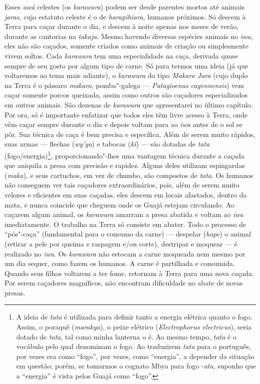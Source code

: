 Esses \emph{awá} celestes (os \emph{karawara}) podem ser desde parentes
mortos até animais \emph{jaras,} cujo estatuto celeste é o de
\emph{harapihiara}, humanos próximos. Só descem à Terra para caçar
durante o dia, e descem à noite apenas nos meses de verão, durante as
cantorias na \emph{takaja}. Mesmo havendo diversas espécies animais no
\emph{iwa}, eles não são caçados, somente criados como animais de
criação ou simplesmente vivem soltos. Cada \emph{karawara} tem uma
especialidade na caça, derivada quase sempre de seu gosto por algum tipo
de carne. Só para termos uma ideia (já que voltaremos ao tema mais
adiante), o \emph{karawara} do tipo \emph{Makaro Jara} (cujo duplo na
Terra é o pássaro \emph{makaro}, pomba"-galega --- \emph{Patagioenas}
\emph{cayennensis}) vem caçar somente porcos queixada, assim como outros
são caçadores especializados em outros animais. São dezenas de
\emph{karawara} que apresentarei no último capítulo. Por ora, só é
importante enfatizar que todos eles têm livre acesso à Terra, onde vêm
caçar sempre durante o dia e depois voltam para ao \emph{iwa} antes de o
sol se pôr. Sua técnica de caça é bem precisa e específica. Além de
serem muito rápidos, suas armas --- flechas (\emph{wy'ya}) e tabocas
(\emph{kĩ}) --- são dotadas de \emph{tata} (fogo/energia)\footnote{A ideia
  de \emph{tata} é utilizada para definir tanto a energia elétrica
  quanto o fogo. Assim, o poraquê (\emph{marakya}), o peixe elétrico
  (\emph{Electrophorus electricus}), seria dotado de \emph{tata}, tal
  como minha lanterna o é. Ao mesmo tempo, \emph{tata} é o vocábulo pelo
  qual denominam o fogo. Ao traduzirem \emph{tata} para o português, por
  vezes era como ``fogo'', por vezes, como ``energia'', a depender da
  situação em questão; porém, se tomarmos o cognato Mbya para fogo
  -\emph{ata}, suponho que a ``energia'' é vista pelos Guajá como ``fogo''.},
proporcionando"-lhes uma vantagem técnica durante a caçada que aniquila a
presa com precisão e rapidez. Alguns deles utilizam espingardas
(\emph{maka}), e seus cartuchos, em vez de chumbo, são compostos de
\emph{tata}. Os humanos não conseguem ver tais caçadores
extraordinários, pois, além de serem muito velozes e eficientes em suas
caçadas, eles descem em locais afastados, dentro da mata, e nunca
coincide que cheguem onde os Guajá estejam circulando. Ao caçarem algum
animal, os \emph{karawara} amarram a presa abatida e voltam ao
\emph{iwa} imediatamente. O trabalho na Terra só consiste em abater.
Todo o processo de ``pós"-caça'' (fundamental para o consumo da carne) ---
despelar (\emph{hape}) o animal (retirar a pele por queima e raspagem
e/ou corte), destripar e moquear --- é realizado no \emph{iwa}. Os
\emph{karawara} não estocam a carne moqueada nem mesmo por um dia
sequer, como fazem os humanos. A carne é partilhada e consumida. Quando
seus filhos voltarem a ter fome, retornam à Terra para uma nova caçada.
Por serem caçadores magníficos, não encontram dificuldade no abate de
novas presas.

